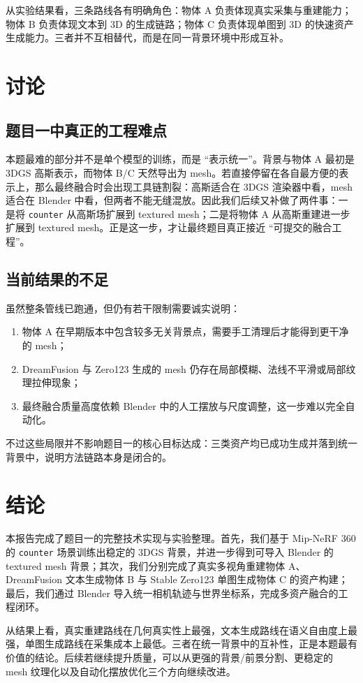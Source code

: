 \documentclass[UTF8,a4paper,11pt]{ctexart}
\begin{document}
从实验结果看，三条路线各有明确角色：物体 A 负责体现真实采集与重建能力；物体 B 负责体现文本到 3D 的生成链路；物体 C 负责体现单图到 3D 的快速资产生成能力。三者并不互相替代，而是在同一背景环境中形成互补。

\section{讨论}

\subsection{题目一中真正的工程难点}

本题最难的部分并不是单个模型的训练，而是 ``表示统一''。背景与物体 A 最初是 3DGS 高斯表示，而物体 B/C 天然导出为 mesh。若直接停留在各自最方便的表示上，那么最终融合时会出现工具链割裂：高斯适合在 3DGS 渲染器中看，mesh 适合在 Blender 中看，但两者不能无缝混放。因此我们后续又补做了两件事：一是将 \texttt{counter} 从高斯场扩展到 textured mesh；二是将物体 A 从高斯重建进一步扩展到 textured mesh。正是这一步，才让最终题目真正接近 ``可提交的融合工程''。

\subsection{当前结果的不足}

虽然整条管线已跑通，但仍有若干限制需要诚实说明：
\begin{enumerate}[itemsep=2pt]
  \item 物体 A 在早期版本中包含较多无关背景点，需要手工清理后才能得到更干净的 mesh；
  \item DreamFusion 与 Zero123 生成的 mesh 仍存在局部模糊、法线不平滑或局部纹理拉伸现象；
  \item 最终融合质量高度依赖 Blender 中的人工摆放与尺度调整，这一步难以完全自动化。
\end{enumerate}

不过这些局限并不影响题目一的核心目标达成：三类资产均已成功生成并落到统一背景中，说明方法链路本身是闭合的。

\section{结论}

本报告完成了题目一的完整技术实现与实验整理。首先，我们基于 Mip-NeRF 360 的 \texttt{counter} 场景训练出稳定的 3DGS 背景，并进一步得到可导入 Blender 的 textured mesh 背景；其次，我们分别完成了真实多视角重建物体 A、DreamFusion 文本生成物体 B 与 Stable Zero123 单图生成物体 C 的资产构建；最后，我们通过 Blender 导入统一相机轨迹与世界坐标系，完成多资产融合的工程闭环。

从结果上看，真实重建路线在几何真实性上最强，文本生成路线在语义自由度上最强，单图生成路线在采集成本上最低。三者在统一背景中的互补性，正是本题最有价值的结论。后续若继续提升质量，可以从更强的背景/前景分割、更稳定的 mesh 纹理化以及自动化摆放优化三个方向继续改进。
\end{document}
